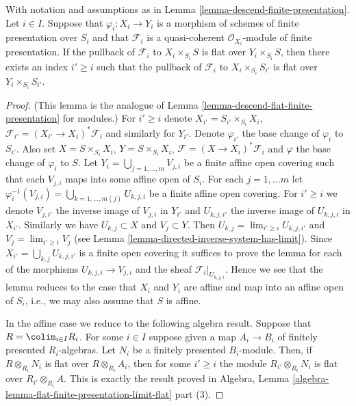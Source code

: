 \begin{lemma}
\label{lemma-descend-module-flat-finite-presentation}
With notation and assumptions as in
Lemma \ref{lemma-descend-finite-presentation}.
Let $i \in I$.
Suppose that $\varphi_i : X_i \to Y_i$ is a morphism of schemes
of finite presentation over $S_i$ and that $\mathcal{F}_i$ is a
quasi-coherent $\mathcal{O}_{X_i}$-module of finite presentation.
If the pullback of $\mathcal{F}_i$ to $X_i \times_{S_i} S$ is flat
over $Y_i \times_{S_i} S$, then there exists an index $i' \geq i$
such that the pullback of $\mathcal{F}_i$ to $X_i \times_{S_i} S_{i'}$
is flat over $Y_i \times_{S_i} S_{i'}$.
\end{lemma}

\begin{proof}
(This lemma is the analogue of
Lemma \ref{lemma-descend-flat-finite-presentation}
for modules.)
For $i' \geq i$ denote $X_{i'} = S_{i'} \times_{S_i} X_i$,
$\mathcal{F}_{i'} = (X_{i'} \to X_i)^*\mathcal{F}_i$ and similarly
for $Y_{i'}$. Denote $\varphi_{i'}$ the base change
of $\varphi_i$ to $S_{i'}$. Also set $X = S \times_{S_i} X_i$,
$Y =S \times_{S_i} X_i$, $\mathcal{F} = (X \to X_i)^*\mathcal{F}_i$
and $\varphi$ the base change of $\varphi_i$ to $S$.
Let $Y_i = \bigcup_{j = 1, \ldots, m} V_{j, i}$ be a finite affine open
covering such that each $V_{j, i}$ maps into some affine open of $S_i$.
For each $j = 1, \ldots m$ let
$\varphi_i^{-1}(V_{j, i}) = \bigcup_{k = 1, \ldots, m(j)} U_{k, j, i}$
be a finite affine open covering. For $i' \geq i$ we denote
$V_{j, i'}$ the inverse image of $V_{j, i}$ in $Y_{i'}$ and
$U_{k, j, i'}$ the inverse image of $U_{k, j, i}$ in $X_{i'}$.
Similarly we have $U_{k, j} \subset X$ and $V_j \subset Y$.
Then $U_{k, j} = \lim_{i' \geq i} U_{k, j, i'}$
and $V_j = \lim_{i' \geq i} V_j$
(see Lemma \ref{lemma-directed-inverse-system-has-limit}).
Since $X_{i'} = \bigcup_{k, j} U_{k, j, i'}$ is a finite open covering
it suffices to prove the lemma for each of the morphisms
$U_{k, j, i} \to V_{j, i}$ and the sheaf $\mathcal{F}_i|_{U_{k, j, i}}$.
Hence we see that the lemma reduces to the case that $X_i$ and
$Y_i$ are affine and map into an affine open of $S_i$, i.e., we
may also assume that $S$ is affine.

\medskip\noindent
In the affine case we reduce to the following algebra result.
Suppose that $R = \colim_{i \in I} R_i$. For some $i \in I$
suppose given a map $A_i \to B_i$ of finitely presented $R_i$-algebras.
Let $N_i$ be a finitely presented $B_i$-module.
Then, if $R \otimes_{R_i} N_i$ is flat over $R \otimes_{R_i} A_i$,
then for some $i' \geq i$ the module
$R_{i'} \otimes_{R_i} N_i$ is flat over $R_{i'} \otimes_{R_i} A$.
This is exactly the result proved in
Algebra,
Lemma \ref{algebra-lemma-flat-finite-presentation-limit-flat} part (3).
\end{proof}

